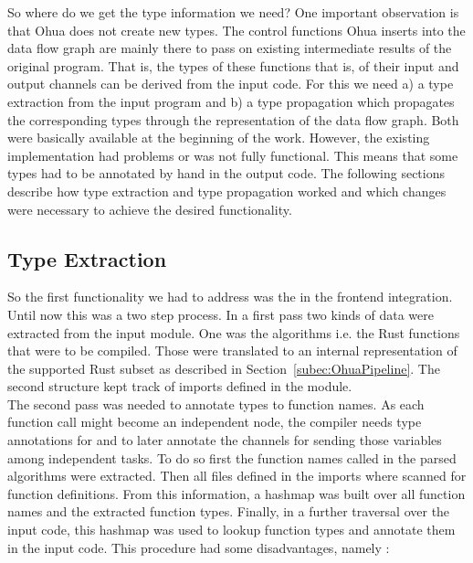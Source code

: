 So where do we get the type information we need? One important observation is that Ohua does not create new types. The control functions Ohua inserts into the data flow graph are mainly there to pass on existing intermediate results of the original program. That is, the types of these functions that is, of their input and output channels can be derived from the input code. For this we need a) a type extraction from the input program and b) a type propagation which propagates the corresponding types through the representation of the data flow graph. Both were basically available at the beginning of the work. However, the existing implementation had problems or was not fully functional. This means that some types had to be annotated by hand in the output code. The following sections describe how type extraction and type propagation worked and which changes were necessary to achieve the desired functionality. \\

\subsection{Type Extraction}
So the first functionality we had to address was the  in the frontend integration. Until now this was a two step process. In a first pass two kinds of data were extracted from the input module. One was the algorithms i.e. the Rust functions that were to be compiled. Those were translated to an internal representation of the supported Rust subset as described in Section~\ref{subec:OhuaPipeline}. The second structure kept track of imports defined in the module. \\

The second pass was needed to annotate types to function names. As each function call  might become an independent node, the compiler needs type annotations for  and  to later annotate the channels for sending those variables among independent tasks. To do so first the function names called in the parsed algorithms were extracted. Then all files defined in the imports where scanned for function definitions. From this information, a hashmap was built over all function names and the extracted function types. Finally, in a further traversal over the input code, this hashmap was used to lookup function types and annotate them in the input code. This procedure had some disadvantages, namely : 


